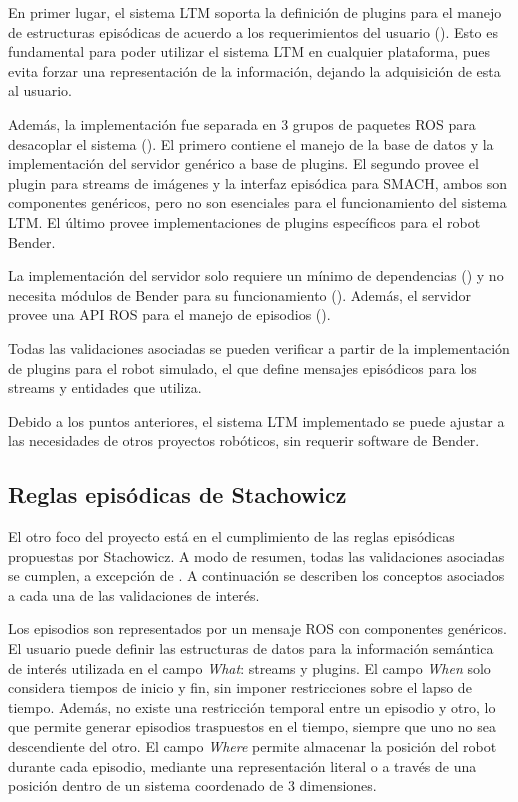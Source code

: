 En primer lugar, el sistema LTM soporta la definición de plugins para el manejo de estructuras episódicas de acuerdo a los requerimientos del usuario (). Esto es fundamental para poder utilizar el sistema LTM en cualquier plataforma, pues evita forzar una representación de la información, dejando la adquisición de esta al usuario.

Además, la implementación fue separada en 3 grupos de paquetes ROS para desacoplar el sistema (). El primero contiene el manejo de la base de datos y la implementación del servidor genérico a base de plugins. El segundo provee el plugin para streams de imágenes y la interfaz episódica para SMACH, ambos son componentes genéricos, pero no son esenciales para el funcionamiento del sistema LTM. El último provee implementaciones de plugins específicos para el robot Bender.

La implementación del servidor solo requiere un mínimo de dependencias () y no necesita módulos de Bender para su funcionamiento (). Además, el servidor provee una API ROS para el manejo de episodios ().

Todas las validaciones asociadas se pueden verificar a partir de la implementación de plugins para el robot simulado, el que define mensajes episódicos para los streams y entidades que utiliza.

Debido a los puntos anteriores, el sistema LTM implementado se puede ajustar a las necesidades de otros proyectos robóticos, sin requerir software de Bender.


\subsection{Reglas episódicas de Stachowicz}

El otro foco del proyecto está en el cumplimiento de las reglas episódicas propuestas por Stachowicz. A modo de resumen, todas las validaciones asociadas se cumplen, a excepción de . A continuación se describen los conceptos asociados a cada una de las validaciones de interés.

Los episodios son representados por un mensaje ROS con componentes genéricos. El usuario puede definir las estructuras de datos para la información semántica de interés utilizada en el campo \textit{What}: streams y plugins. El campo \textit{When} solo considera tiempos de inicio y fin, sin imponer restricciones sobre el lapso de tiempo. Además, no existe una restricción temporal entre un episodio y otro, lo que permite generar episodios traspuestos en el tiempo, siempre que uno no sea descendiente del otro. El campo \textit{Where} permite almacenar la posición del robot durante cada episodio, mediante una representación literal o a través de una posición dentro de un sistema coordenado de 3 dimensiones.

